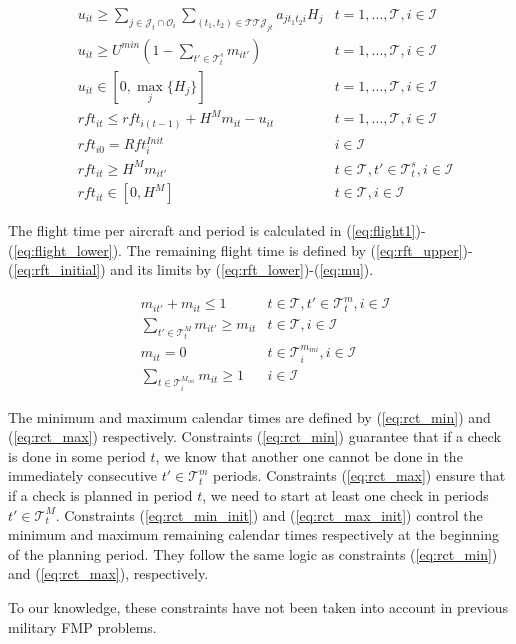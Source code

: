 \documentclass[a4paper,onecolumn,fleqn]{article}
\begin{document}
    \begin{align}
         & u_{it} \geq \sum_{j \in \mathcal{J}_t \cap \mathcal{O}_i} \sum_{(t_1, t_2) \in \mathcal{T}\mathcal{T}\mathcal{J}_{jt}} a_{jt_1t_2i} H_j 
            & t =1, ..., \mathcal{T}, i \in \mathcal{I} \label{eq:flight1}\\
         & u_{it} \geq U^{min} (1 - \sum_{t' \in \mathcal{T}^s_t} m_{it'})
            & t =1, ..., \mathcal{T}, i \in \mathcal{I} \label{eq:flight2}\\
         & u_{it} \in [0, \max_j{\{H_j\}}]
            & t =1, ..., \mathcal{T}, i \in \mathcal{I} \label{eq:flight_lower}\\
         & rft_{it} \leq rft_{i(t-1)} + H^M m_{it} - u_{it}
            & t =1, ..., \mathcal{T}, i \in \mathcal{I} \label{eq:rft_upper}\\
        & rft_{i0} = Rft^{Init}_i
               & i \in \mathcal{I} \label{eq:rft_initial}\\
        & rft_{it} \geq H^M m_{it'}
                & t \in \mathcal{T}, t' \in \mathcal{T}^s_t, i \in \mathcal{I}\label{eq:rft_lower}\\ 
        & rft_{it} \in [0,H^M]
                & t \in \mathcal{T}, i \in \mathcal{I} \label{eq:mu}
    \end{align}

    The flight time per aircraft and period is calculated in (\ref{eq:flight1})-(\ref{eq:flight_lower}). The remaining flight time is defined by (\ref{eq:rft_upper})-(\ref{eq:rft_initial}) and its limits by (\ref{eq:rft_lower})-(\ref{eq:mu}).

    \begin{align}
        & m_{it'} + m_{it} \leq 1
          & t \in \mathcal{T}, t' \in \mathcal{T}^m_t, i \in \mathcal{I}\label{eq:rct_min}\\ 
        & \sum_{t' \in \mathcal{T}^M_t} m_{it'} \geq  m_{it}
          & t \in \mathcal{T}, i \in \mathcal{I}\label{eq:rct_max}\\
        & m_{it} = 0
          & t \in \mathcal{T}^{m_{ini}}_i, i \in \mathcal{I}\label{eq:rct_min_init} \\
        & \sum_{t \in \mathcal{T}^{M_{ini}}_i} m_{it} \geq  1 
          & i \in \mathcal{I}\label{eq:rct_max_init}
    \end{align}

    The minimum and maximum calendar times are defined by (\ref{eq:rct_min}) and (\ref{eq:rct_max}) respectively. Constraints (\ref{eq:rct_min}) guarantee that if a check is done in some period $t$, we know that another one cannot be done in the immediately consecutive $t' \in \mathcal{T}_{t}^{m}$ periods. Constraints (\ref{eq:rct_max}) ensure that if a check is planned in period $t$, we need to start at least one check in periods $t' \in \mathcal{T}_{t}^{M}$. Constraints (\ref{eq:rct_min_init}) and (\ref{eq:rct_max_init}) control the minimum and maximum remaining calendar times respectively at the beginning of the planning period. They follow the same logic as constraints (\ref{eq:rct_min}) and (\ref{eq:rct_max}), respectively.

    To our knowledge, these constraints have not been taken into account in previous military FMP problems.
\end{document}
